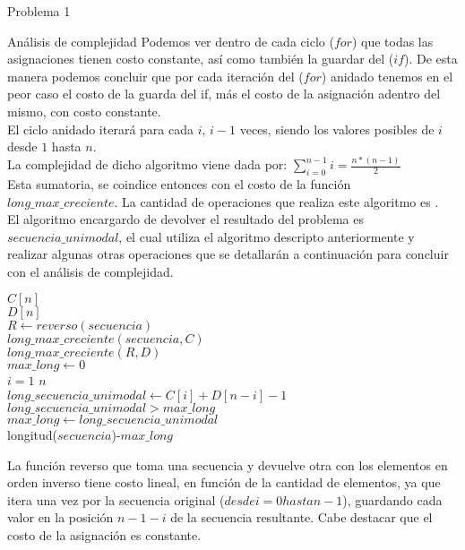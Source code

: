 \begin{section}{Problema 1}
\begin{subsection}{Análisis de complejidad}
	Podemos ver dentro de cada ciclo ($for$) que todas las asignaciones tienen costo constante, así como también la guardar del ($if$). De esta manera podemos concluir que por cada iteración del ($for$) anidado tenemos en el peor caso el costo de la guarda del if, más el costo de la asignación adentro del mismo, con costo constante.\\
	El ciclo anidado iterará para cada $i$, $i-1$ veces, siendo los valores posibles de $i$ desde $1$ hasta $n$.\\

	La complejidad de dicho algoritmo viene dada por: $\sum_{i=0}^{n-1} i = \frac{n*(n-1)}{2}$\\

	Esta sumatoria, se coindice entonces con el costo de la función $long\_max\_creciente$. La cantidad de operaciones que realiza este algoritmo es .\\
	
	El algoritmo encargardo de devolver el resultado del problema es $secuencia\_unimodal$, el cual utiliza el algoritmo descripto anteriormente y realizar algunas otras operaciones que se detallarán a continuación para concluir con el análisis de complejidad.\\
	
		\vspace{0.5cm}
		\begin{pseudo}
			\tab $C[n]$\\
			\tab $D[n]$\\
			\tab $R \leftarrow reverso(secuencia)$ 		 \\
			\tab $long\_max\_creciente(secuencia,C)$ 	\\
			\tab $long\_max\_creciente(R,D)$		\\
			\tab $max\_long \leftarrow 0$			\\
			\tab \FOR $i=1$ \TO $n$				\\
			\tab \tab $long\_secuencia\_unimodal\leftarrow C[i]+D[n-i]-1$ 	\\
			\tab \tab \IF $ long\_secuencia\_unimodal >  max\_long$ 	\\
			\tab \tab \tab $max\_long \leftarrow long\_secuencia\_unimodal$ \\
			\tab \RET longitud($secuencia$)-$max\_long$ 			\\
		\end{pseudo}
		
	La función reverso que toma una secuencia y devuelve otra con los elementos en orden inverso tiene costo lineal, en función de la cantidad de elementos, ya que itera una vez por la secuencia original ($desde i=0 hasta n-1$), guardando cada valor en la posición $n-1-i$ de la secuencia resultante. Cabe destacar que el costo de la asignación es constante.\\


\end{subsection}
\end{section}

